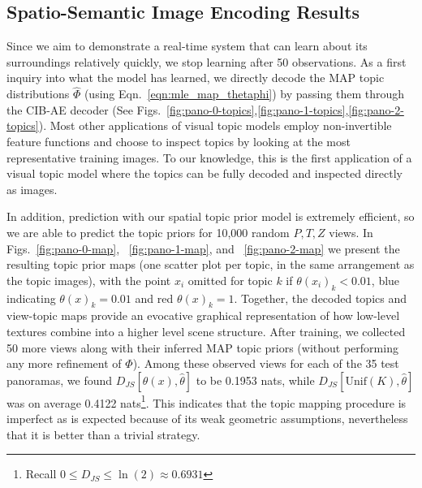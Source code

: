 \subsection{Spatio-Semantic Image Encoding Results}

Since we aim to demonstrate a real-time system that can learn about its surroundings relatively quickly, we stop learning after 50 observations. As a first inquiry into what the model has learned, we directly decode the MAP topic distributions $\hat{\Phi}$ (using Eqn.~\ref{eqn:mle_map_thetaphi}) by passing them through the CIB-AE decoder (See Figs.~\ref{fig:pano-0-topics},\ref{fig:pano-1-topics},\ref{fig:pano-2-topics}). Most other applications of visual topic models employ non-invertible feature functions and choose to inspect topics by looking at the most representative training images. To our knowledge, this is the first application of a visual topic model where the topics can be fully decoded and inspected directly as images.

In addition, prediction with our spatial topic prior model is extremely efficient, so we are able to predict the topic priors for 10,000 random $P,T,Z$ views. In Figs.~\ref{fig:pano-0-map}, ~\ref{fig:pano-1-map}, and ~\ref{fig:pano-2-map} we present the resulting topic prior maps (one scatter plot per topic, in the same arrangement as the topic images), with the point $x_i$ omitted for topic $k$ if $\theta(x_i)_k < 0.01$, blue indicating $\theta(x)_k = 0.01$ and red $\theta(x)_k = 1$. Together, the decoded topics and view-topic maps provide an evocative graphical representation of how low-level textures combine into a higher level scene structure. After training, we collected 50 more views along with their inferred MAP topic priors (without performing any more refinement of $\Phi$). Among these observed views for each of the 35 test panoramas, we found $D_{JS}[\theta(x), \hat{\theta}]$ to be 0.1953 nats, while $D_{JS}[\mathrm{Unif}(K), \hat{\theta}]$ was on average 0.4122 nats\footnote{Recall $0 \leq D_{JS} \leq \ln(2) \approx 0.6931$}. This indicates that the topic mapping procedure is imperfect as is expected because of its weak geometric assumptions, nevertheless that it is better than a trivial strategy.

